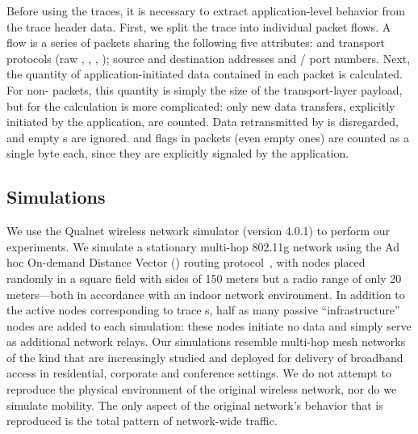\documentclass[twocolumn,final]{svjour3}
\begin{document}


Before using the traces, it is necessary to extract application-level behavior from the trace header data. First, we split the trace into individual packet flows. A flow is a series of packets sharing the following five attributes:  and transport protocols (raw , , , ); source and destination  addresses and / port numbers. Next, the quantity of application-initiated data contained in each packet is calculated. For non- packets, this quantity is simply the size of the transport-layer payload, but for  the calculation is more complicated: only new data transfers, explicitly initiated by the application, are counted. Data retransmitted by  is disregarded, and empty s are ignored.  and  flags in packets (even empty ones) are counted as a single byte each, since they are explicitly signaled by the application. %

\subsection{Simulations}
\label{sec:simulations}

We use the Qualnet wireless network simulator (version 4.0.1) to perform our experiments. We simulate a stationary multi-hop 802.11g network using the Ad hoc On-demand Distance Vector () routing protocol~\cite{rfc:aodv}, with nodes placed randomly in a square field with sides of 150 meters but a radio range of only 20 meters---both in accordance with an indoor network environment.
In addition to the active nodes corresponding to trace s, half as many passive ``infrastructure'' nodes are added to each simulation: these nodes initiate no data and simply serve as additional network relays. Our simulations resemble multi-hop mesh networks of the kind that are increasingly studied and deployed for delivery of broadband access in residential, corporate and conference settings. We do not attempt to reproduce the physical environment of the original wireless network, nor do we simulate mobility. The only aspect of the original network's behavior that is reproduced is the total pattern of network-wide traffic.
\end{document}
